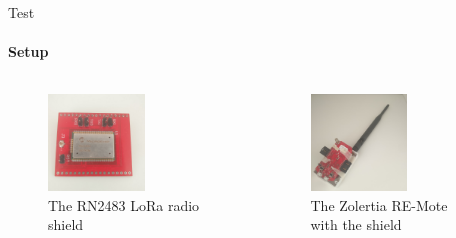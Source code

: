 \begin{frame}{Test}
\framesubtitle{Setup}
\begin{columns}
\begin{column}{0.5\textwidth}

\begin{figure}[H]
    \centering
    \includegraphics[width=0.6\textwidth]{presentation.tex/fig/rn2483.jpg}
    \caption{The RN2483 LoRa radio shield\label{fig:rn2483pic}}
\end{figure}
\end{column}
\begin{column}{0.5\textwidth}
\begin{figure}[H]
    \centering
    \includegraphics[width=0.6\textwidth]{presentation.tex/fig/zolertia.jpg}
    \caption{The Zolertia RE-Mote with the shield\label{fig:zolpic}}
\end{figure}
\end{column}
\end{columns}
\end{frame}

